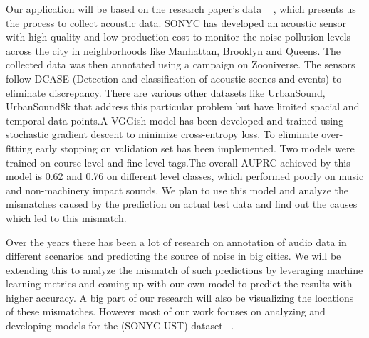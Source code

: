 Our application will be based on the research paper's data ~ \cite{4}, which presents us the process to collect acoustic data. SONYC has developed an acoustic sensor with high quality and low production cost to monitor the noise pollution levels across the city in neighborhoods like Manhattan, Brooklyn and Queens. The collected data was then annotated using a campaign on Zooniverse. The sensors follow DCASE (Detection and classification of acoustic scenes and events) to eliminate discrepancy. There are various other datasets like UrbanSound, UrbanSound8k that address this particular problem but have limited spacial and temporal data points.A VGGish model has been developed and trained using stochastic gradient descent to minimize cross-entropy loss. To eliminate over-fitting early stopping on validation set has been implemented. Two models were trained on course-level and fine-level tags.The overall AUPRC achieved by this model is 0.62 and 0.76 on different level classes, which performed poorly on music and non-machinery impact sounds. We plan to use this model and analyze the mismatches caused by the prediction on actual test data and find out the causes which led to this mismatch. 

Over the years there has been a lot of research on annotation of audio data in different scenarios and predicting the source of noise in big cities. We will be extending this to analyze the mismatch of such predictions by leveraging machine learning metrics and coming up with our own model to predict the results with higher accuracy. A big part of our research will also be visualizing the locations of these mismatches. However most of our work focuses on analyzing and developing models for the (SONYC-UST) dataset ~\cite{7}.
